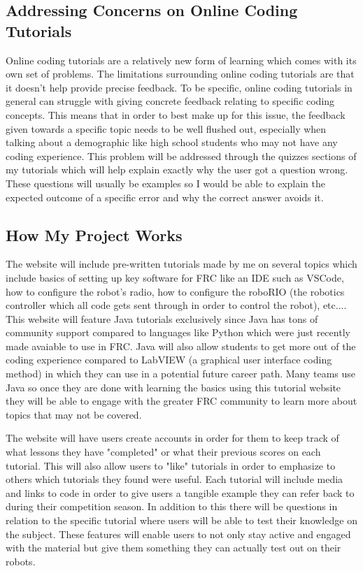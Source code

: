 \documentclass[10pt,twocolumn]{article}
\begin{document}
\subsection{Addressing Concerns on Online Coding Tutorials}
Online coding tutorials are a relatively new form of learning which comes with its own set of problems. The limitations surrounding online coding tutorials are that it doesn't help provide precise feedback. To be specific, online coding tutorials in general can struggle with giving concrete feedback relating to specific coding concepts\cite{kim_pedagogical_2017}. This means that in order to best make up for this issue, the feedback given towards a specific topic needs to be well flushed out, especially when talking about a demographic like high school students who may not have any coding experience. This problem will be addressed through the quizzes sections of my tutorials which will help explain exactly why the user got a question wrong. These questions will usually be examples so I would be able to explain the expected outcome of a specific error and why the correct answer avoids it.

\subsection{How My Project Works}

The website will include pre-written tutorials made by me on several topics which include basics of setting up key software for FRC like an IDE such as VSCode, how to configure the robot's radio, how to configure the roboRIO (the robotics controller which all code gets sent through in order to control the robot), etc.... This website will feature Java tutorials exclusively since Java has tons of community support compared to languages like Python which were just recently made avaiable to use in FRC. Java will also allow students to get more out of the coding experience compared to LabVIEW (a graphical user interface coding method) in which they can use in a potential future career path. Many teams use Java so once they are done with learning the basics using this tutorial website they will be able to engage with the greater FRC community to learn more about topics that may not be covered.

The website will have users create accounts in order for them to keep track of what lessons they have "completed" or what their previous scores on each tutorial. This will also allow users to "like" tutorials in order to emphasize to others which tutorials they found were useful. Each tutorial will include media and links to code in order to give users a tangible example they can refer back to during their competition season. In addition to this there will be questions in relation to the specific tutorial where users will be able to test their knowledge on the subject. These features will enable users to not only stay active and engaged with the material but give them something they can actually test out on their robots. 
\end{document}
